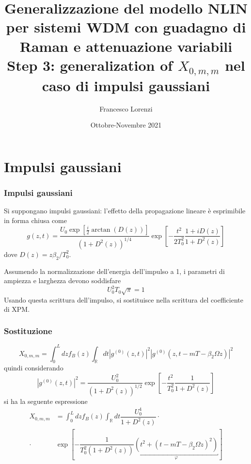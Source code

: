 \documentclass[8pt]{beamer} %
\title{Generalizzazione del modello NLIN per sistemi WDM con guadagno di Raman e attenuazione variabili\\ \vspace{10pt} \small{Step 3: generalization of $X_{0, m, m}$ nel caso di impulsi gaussiani}}
\author{Francesco Lorenzi}
\date{Ottobre-Novembre 2021}
\institute[Università degli studi di Padova \\ Dipartimento di ingegneria dell'informazione]{}
\begin{document}
\expandafter\def\expandafter\insertshorttitle\expandafter{%
  \insertshorttitle\hfill%
  \insertframenumber\,/\,\inserttotalframenumber}
\begin{frame}
	\maketitle
\end{frame}
\section{Impulsi gaussiani}
\begin{frame}
	\frametitle{Impulsi gaussiani}
	Si suppongano impulsi gaussiani: l'effetto della propagazione lineare è esprimibile in forma chiusa come
	\begin{equation}\label{eq:field}
		g(z, t) = \frac{U_0 \exp[\frac{i}{2} \arctan(D(z))]}{(1+D^2(z))^{1/4}} \exp\left[-\frac{t^2}{2T_0^2} \frac{1+iD(z)}{1+D^2(z)}\right]
	\end{equation}
	dove $D(z) = z\beta_2 / T_0^2$.
	\vspace{10pt}
	
	Assumendo la normalizzazione dell'energia dell'impulso a 1, i parametri di ampiezza e larghezza devono soddisfare
	\begin{equation}\label{eq:norm}
		U_0^2T_0 \sqrt{\pi} = 1
	\end{equation}
	Usando questa scrittura dell'impulso, si sostituisce nella scrittura del coefficiente di XPM.
\end{frame}

\begin{frame}
	\frametitle{Sostituzione}
	\begin{equation}
		X_{0, m, m} = \int_{0}^{L}dz f_B(z) \int_{\mathbb{R}}dt |g^{(0)}(z, t)|^2 |g^{(0)}(z, t- m T-\beta_2\Omega z)|^2
	\end{equation}
	quindi considerando 
	\begin{equation*}
		|g^{(0)}(z, t)|^2 = \dfrac{U_0^2}{(1+D^2(z))^{1/2}}\exp\left[-\dfrac{t^2}{T_0^2} \dfrac{1}{1+D^2(z)}\right] 
	\end{equation*}
	si ha la seguente espressione
	\begin{align*}
		X_{0, m, m} &= \int_{0}^{L}dz f_B(z) \int_{\mathbb{R}}dt  
		\dfrac{U_0^4}{1+D^2(z)} \cdot \\ \cdot  &\exp\left[-\dfrac{1}{T_0^2(1+D^2(z))} 
		\underbracket{\left(t^2 + (t-mT-\beta_2\Omega z)^2\right)}_{\varphi}\right]
	\end{align*}
\end{frame}
\end{document}
